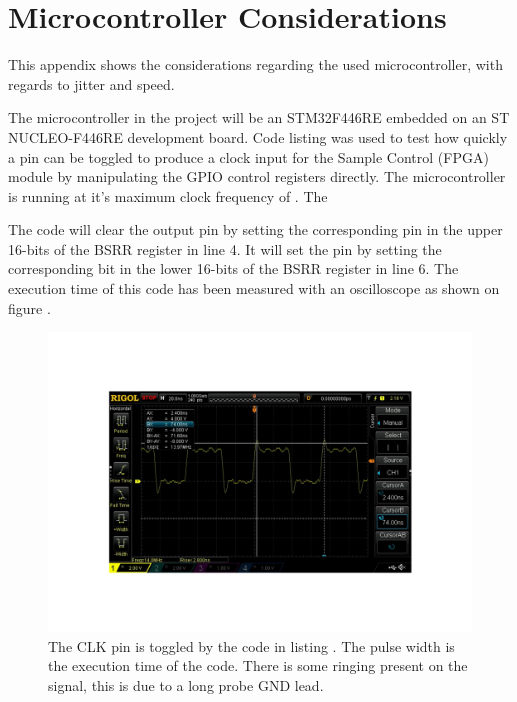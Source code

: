 \chapter{Microcontroller Considerations} \label{App:MicrocontrollerConsiderations}
This appendix shows the considerations regarding the used microcontroller, with regards to jitter and speed.

The microcontroller in the project will be an STM32F446RE\cite{ST_STM32F446RE} embedded on an ST NUCLEO-F446RE\cite{ST_NUCLEOF446RE} development board. Code listing  was used to test how quickly a pin can be toggled to produce a clock input for the Sample Control (FPGA) module by manipulating the GPIO control registers directly. The microcontroller is running at it's maximum clock frequency of . The 



The code will clear the output pin by setting the corresponding pin in the upper 16-bits of the BSRR register in line 4. It will set the pin by setting the corresponding bit in the lower 16-bits of the BSRR register in line 6. The execution time of this code has been measured with an oscilloscope as shown on figure .

\begin{figure}[H]
    \centering
    \includegraphics[clip, trim=0 100 0 100, width=1\textwidth]{Appendix/Figures/IOSetResetSpeed.pdf}
    \caption{The CLK pin is toggled by the code in listing . The pulse width is the execution time of the code. There is some ringing present on the signal, this is due to a long probe GND lead.}
    \label{fig:App_A_SetResetSpeed}
\end{figure}

